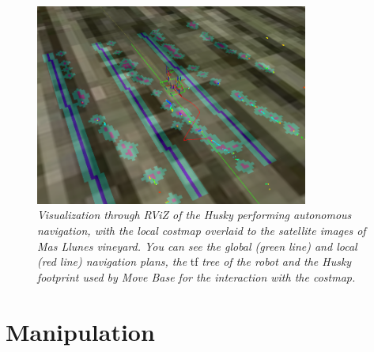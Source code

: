 \begin{figure}
	\centering
	\includegraphics[width=0.8\textwidth]{Images/experimental_data/navigation2_gimped.png}
	\caption{\textit{Visualization through RViZ of the Husky performing autonomous navigation, with the local costmap overlaid to the satellite images of Mas Llunes vineyard. You can see the global (green line) and local (red line) navigation plans, the} tf \textit{tree of the robot and the Husky footprint used by Move Base for the interaction with the costmap.}}
	\label{fig:result_navigation}
\end{figure}


\section{Manipulation}


